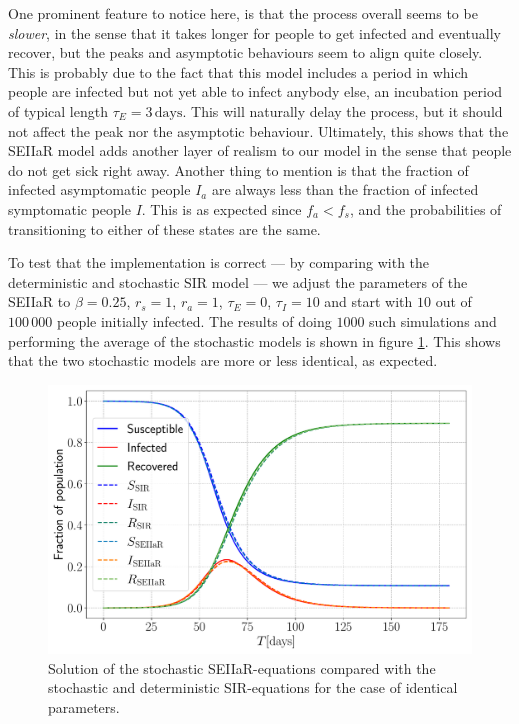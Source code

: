 One prominent feature to notice here, is that the process overall seems to be \textit{slower}, in the sense that it takes longer for people to get infected and eventually recover, but the peaks and asymptotic behaviours seem to align quite closely. This is probably due to the fact that this model includes a period in which people are infected but not yet able to infect anybody else, an incubation period of typical length $\tau_E = 3 \, \mathrm{days}$. This will naturally delay the process, but it should not affect the peak nor the asymptotic behaviour. Ultimately, this shows that the SEIIaR model adds another layer of realism to our model in the sense that people do not get sick right away. Another thing to mention is that the fraction of infected asymptomatic people $I_a$ are always less than the fraction of infected symptomatic people $I$. This is as expected since $f_a < f_s$, and the probabilities of transitioning to either of these states are the same.

To test that the implementation is correct --- by comparing with the deterministic and stochastic SIR model --- we adjust the parameters of the SEIIaR to $\beta = 0.25$, $r_s = 1$, $r_a = 1$, $\tau_E = 0$, $\tau_I= 10$ and start with $10$ out of $100 \, 000$ people initially infected. The results of doing $1000$ such simulations and performing the average of the stochastic models is shown in figure \ref{fig:comparison_SIR}. This shows that the two stochastic models are more or less identical, as expected.

\begin{figure}[htb]
	\centering
	\includegraphics[width=0.8\columnwidth]{../fig/test_comparison.pdf}
	\caption{Solution of the stochastic SEIIaR-equations compared with the stochastic and deterministic SIR-equations for the case of identical parameters.}
	\label{fig:comparison_SIR}
\end{figure}

